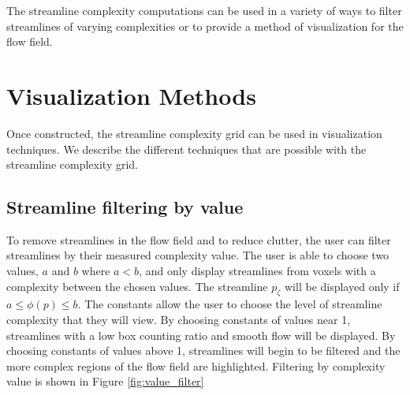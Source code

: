 \documentclass{egpubl}
\begin{document}

The streamline complexity computations can be used in a variety of ways to filter streamlines of varying complexities or to provide a method of visualization for the flow field.

\section{Visualization Methods}

Once constructed, the streamline complexity grid can be used in visualization techniques.
We describe the different techniques that are possible with the streamline complexity grid.

\subsection{Streamline filtering by value}
To remove streamlines in the flow field and to reduce clutter, the user can filter streamlines by their measured complexity value.
The user is able to choose two values, $a$ and $b$ where $a < b$, and only display streamlines from voxels with a complexity between the chosen values. 
The streamline $p_{\zeta}$ will be displayed only if $a \leq \phi(p) \leq b$.
The constants allow the user to choose the level of streamline complexity that they will view.
By choosing constants of values near 1, streamlines with a low box counting ratio and smooth flow will be displayed.
By choosing constants of values above 1, streamlines will begin to be filtered and the more complex regions of the flow field are highlighted.
Filtering by complexity value is shown in Figure \ref{fig:value_filter}
\end{document}
